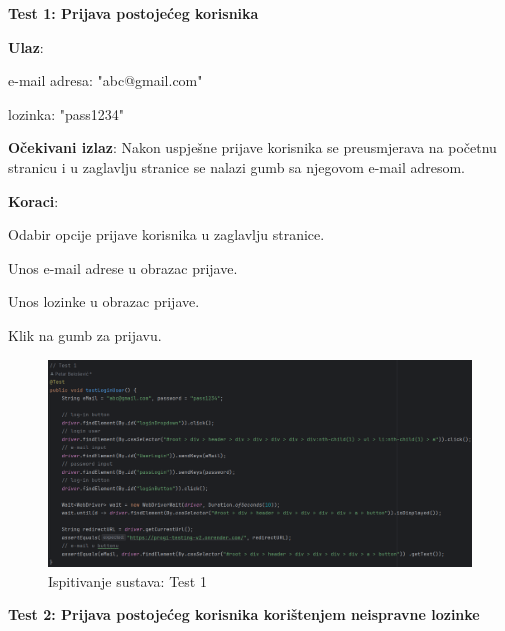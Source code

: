 		 	\textbf{Test 1: Prijava postojećeg korisnika}
		 	
		 	\begin{packed_item} 
		 		\item \textbf{Ulaz}:
		 		\begin{packed_item} 
		 			\item e-mail adresa: "abc@gmail.com"
		 			\item lozinka: "pass1234"
		 		\end{packed_item}
		 		\item \textbf{Očekivani izlaz}: Nakon uspješne prijave korisnika se preusmjerava na početnu stranicu i u zaglavlju stranice se nalazi gumb sa njegovom e-mail adresom.
		 		\item \textbf{Koraci}:
		 		\begin{packed_enum} 
		 			\item Odabir opcije prijave korisnika u zaglavlju stranice.
		 			\item Unos e-mail adrese u obrazac prijave.
		 			\item Unos lozinke u obrazac prijave.
		 			\item Klik na gumb za prijavu.
		 		\end{packed_enum}
		 	\end{packed_item}
		 	
		 	\begin{figure}[H]
		 		\includegraphics[width=\textwidth]{slike/SeleniumTest1.png} %
		 		\caption{Ispitivanje sustava: Test 1}
		 		\label{fig:SeleniumTest1} %
		 	\end{figure}
		 	
		 	\textbf{Test 2: Prijava postojećeg korisnika korištenjem neispravne lozinke}
		 	
